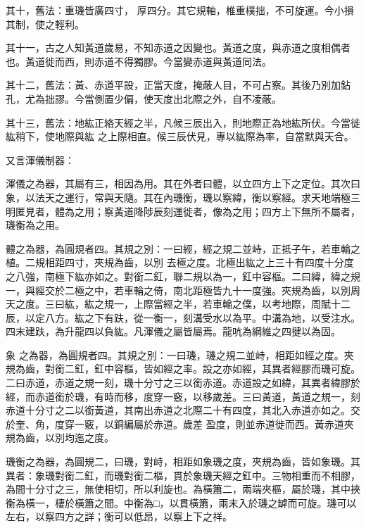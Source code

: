 \begin{pinyinscope}
 其十，舊法：重璣皆廣四寸，
 厚四分。其它規軸，椎重樸拙，不可旋運。今小損其制，使之輕利。



 其十一，古之人知黃道歲易，不知赤道之因變也。黃道之度，與赤道之度相偶者也。黃道徙而西，則赤道不得獨膠。今當變赤道與黃道同法。



 其十二，舊法：黃、赤道平設，正當天度，掩蔽人目，不可占察。其後乃別加鉆孔，尤為拙謬。今當側置少偏，使天度出北際之外，自不凌蔽。



 其十三，舊法：地紘正絡天經之半，凡候三辰出入，則地際正為地紘所伏。今當徙紘稍下，使地際與紘
 之上際相直。候三辰伏見，專以紘際為率，自當默與天合。



 又言渾儀制器：



 渾儀之為器，其屬有三，相因為用。其在外者曰體，以立四方上下之定位。其次曰象，以法天之運行，常與天隨。其在內璣衡，璣以察緯，衡以察經。求天地端極三明匿見者，體為之用；察黃道降陟辰刻運徙者，像為之用；四方上下無所不屬者，璣衡為之用。



 體之為器，為圓規者四。其規之別：一曰經，經之規二並峙，正抵子午，若車輪之植。二規相距四寸，夾規為齒，以別
 去極之度。北極出紘之上三十有四度十分度之八強，南極下紘亦如之。對銜二釭，聯二規以為一，釭中容樞。二曰緯，緯之規一，與經交於二極之中，若車輪之倚，南北距極皆九十一度強。夾規為齒，以別周天之度。三曰紘，紘之規一，上際當經之半，若車輪之僕，以考地際，周賦十二辰，以定八方。紘之下有趺，從一衡一，刻溝受水以為平。中溝為地，以受注水。四末建趺，為升龍四以負紘。凡渾儀之屬皆屬焉。龍吭為綱維之四揵以為固。



 象
 之為器，為圓規者四。其規之別：一曰璣，璣之規二並峙，相距如經之度。夾規為齒，對銜二釭，釭中容樞，皆如經之率。設之亦如經，其異者經膠而璣可旋。二曰赤道，赤道之規一刻，璣十分寸之三以銜赤道。赤道設之如緯，其異者緯膠於經，而赤道銜於璣，有時而移，度穿一竅，以移歲差。三曰黃道，黃道之規一，刻赤道十分寸之二以銜黃道，其南出赤道之北際二十有四度，其北入赤道亦如之。交於奎、角，度穿一竅，以銅編屬於赤道。歲差
 盈度，則並赤道徙而西。黃赤道夾規為齒，以別均迤之度。



 璣衡之為器，為圓規二，曰璣，對峙，相距如象璣之度，夾規為齒，皆如象璣。其異者：象璣對銜二釭，而璣對銜二樞，貫於象璣天經之釭中。三物相重而不相膠，為間十分寸之三，無使相切，所以利旋也。為橫簫二，兩端夾樞，屬於璣，其中挾衡為橫一，棲於橫簫之間。中衡為□，以貫橫簫，兩末入於璣之罅而可旋。璣可以左右，以察四方之詳；衡可以低昂，以察上下之祥。




\end{pinyinscope}
